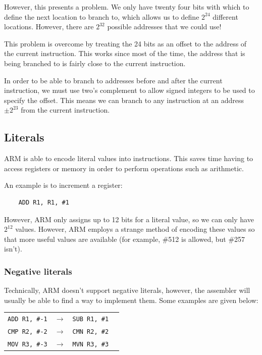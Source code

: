 However, this presents a problem. We only have twenty four bits with which to
define the next location to branch to, which allows us to define $2^{24}$
different locations. However, there are $2^{32}$ possible addresses that we
could use!

This problem is overcome by treating the 24 bits as an offset to the address of
the current instruction. This works since most of the time, the address that is
being branched to is fairly close to the current instruction.

In order to be able to branch to addresses before and after the current
instruction, we must use two's complement to allow signed integers to be used to
specify the offset. This means we can branch to any instruction at an address
$\pm 2^{23}$ from the current instruction.

\subsection{Literals}

ARM is able to encode literal values into instructions. This saves time having
to access registers or memory in order to perform operations such as arithmetic.

An example is to increment a register:

\begin{verbatim}
	ADD	R1, R1, #1
\end{verbatim}

However, ARM only assigns up to 12 bits for a literal value, so we can only have
$2^{12}$ values. However, ARM employs a strange method of encoding these values
so that more useful values are available (for example, \#512 is allowed, but
\#257 isn't).

\subsubsection{Negative literals}

Technically, ARM doesn't support negative literals, however, the assembler will
usually be able to find a way to implement them. Some examples are given below:

\begin{center}
    \begin{tabular}{l l l r}
        {\tt ADD R1, \#-1} & $\rightarrow$ & {\tt SUB R1, \#1}\\
        {\tt CMP R2, \#-2} & $\rightarrow$ & {\tt CMN R2, \#2}\\
        {\tt MOV R3, \#-3} & $\rightarrow$ & {\tt MVN R3, \#3}\\
    \end{tabular}
\end{center}

